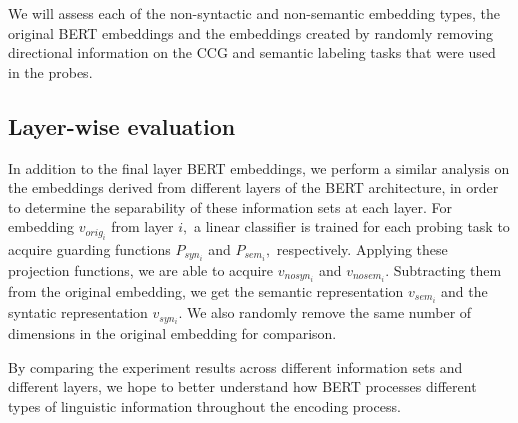 \documentclass[11pt,a4paper]{article}
\begin{document}
We will assess each of the non-syntactic and non-semantic embedding types, the original BERT embeddings and the embeddings created by randomly removing directional information on the CCG and semantic labeling tasks that were used in the probes. 




\subsection{Layer-wise evaluation}
In addition to the final layer BERT embeddings, we perform a similar analysis on the embeddings derived from different layers of the BERT architecture, in order to determine the separability of these information sets at each layer. For embedding $v_{orig_i}$ from layer $i,$ a linear classifier is trained for each probing task to acquire guarding functions $P_{syn_i}$ and $P_{sem_i},$ respectively. Applying these projection functions, we are able to acquire $v_{nosyn_i}$ and $v_{nosem_i}.$ Subtracting them from the original embedding, we get the semantic representation $v_{sem_i}$ and the syntatic representation $v_{syn_i}.$ We also randomly remove the same number of dimensions in the original embedding for comparison.

By comparing the experiment results across different information sets and different layers, we hope to better understand how BERT processes different types of linguistic information throughout the encoding process.
\end{document}
